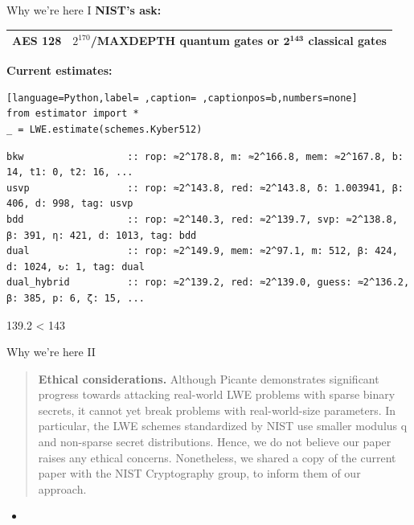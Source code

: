 \documentclass[xcolor=table,10pt,aspectratio=169]{beamer}
\begin{document}
\begin{frame}[label={sec:orgd2c5d9d},fragile]{Why we're here I}
 \textbf{NIST's ask:}

\begin{center}
\begin{tabular}{ll}
\toprule
AES 128 & \(2^{170}\)/MAXDEPTH quantum gates or \(\mathbf{2^{143}}\) classical gates\footnotemark\\[0pt]
\bottomrule
\end{tabular}

\end{center}

\textbf{Current estimates:}

\begin{lstlisting}[language=Python,label= ,caption= ,captionpos=b,numbers=none]
from estimator import *
_ = LWE.estimate(schemes.Kyber512)
\end{lstlisting}

\begin{verbatim}
bkw                  :: rop: ≈2^178.8, m: ≈2^166.8, mem: ≈2^167.8, b: 14, t1: 0, t2: 16, ...
usvp                 :: rop: ≈2^143.8, red: ≈2^143.8, δ: 1.003941, β: 406, d: 998, tag: usvp
bdd                  :: rop: ≈2^140.3, red: ≈2^139.7, svp: ≈2^138.8, β: 391, η: 421, d: 1013, tag: bdd
dual                 :: rop: ≈2^149.9, mem: ≈2^97.1, m: 512, β: 424, d: 1024, ↻: 1, tag: dual
dual_hybrid          :: rop: ≈2^139.2, red: ≈2^139.0, guess: ≈2^136.2, β: 385, p: 6, ζ: 15, ...
\end{verbatim}

\begin{center}
\alert{{139.2 < 143}}
\end{center}
\end{frame}

\begin{frame}[label={sec:org362fcc4}]{Why we're here II}
\begin{quote}
\textbf{Ethical considerations.} Although Picante demonstrates significant progress towards attacking real-world LWE problems with sparse binary secrets, \alert{it cannot yet break} problems with real-world-size parameters. In particular, the LWE schemes standardized by NIST use smaller modulus q and non-sparse secret distributions. Hence, we do not believe our paper raises any ethical concerns. Nonetheless, we shared a copy of the current paper with the NIST Cryptography group, to inform them of our approach.
\end{quote}

\begin{itemize}
\item {\footnotesize {} \par}
\end{itemize}
\end{frame}
\end{document}
